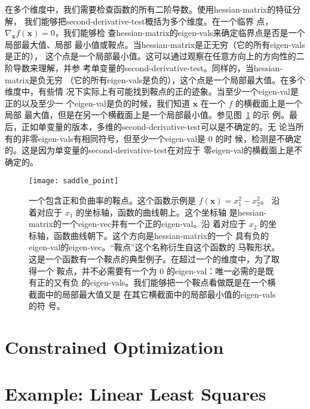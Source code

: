 在多个维度中，我们需要检查函数的所有二阶导数。使用\gls*{hessian-matrix}的特征分解，
我们能够把\gls*{second-derivative-test}概括为多个维度。在一个临界
点，$\nabla_{\pmb{x}}f(\pmb{x}) = 0$，我们能够检
查\gls*{hessian-matrix}的\gls*{eigen-vals}来确定临界点是否是一个局部最大值、局部
最小值或鞍点。当\gls*{hessian-matrix}是正无穷（它的所有\gls*{eigen-vals}是正的），
这个点是一个局部最小值。这可以通过观察在任意方向上的方向性的二阶导数来理解，并参
考单变量的\gls*{second-derivative-test}。同样的，当\gls*{hessian-matrix}是负无穷
（它的所有\gls*{eigen-vals}是负的），这个点是一个局部最大值。在多个维度中，有些情
况下实际上有可能找到鞍点的正的迹象。当至少一个\gls*{eigen-val}是正的以及至少一
个\gls*{eigen-val}是负的时候，我们知道 $\pmb{x}$ 在一个 $f$ 的横截面上是一个局部
最大值，但是在另一个横截面上是一个局部最小值。参见图~\ref{fig:saddle_point} 的示
例。最后，正如单变量的版本，多维的\gls*{second-derivative-test}可以是不确定的。无
论当所有的非零\gls*{eigen-vals}有相同符号，但至少一个\gls*{eigen-val}是 $0$ 的时
候，检测是不确定的。这是因为单变量的\gls*{second-derivative-test}在对应于
零\gls*{eigen-val}的横截面上是不确定的。

\begin{figure}[h]
  \centering
  \texttt{[image: saddle\_point]}
  \caption{一个包含正和负曲率的鞍点。这个函数示例是 $f(\pmb{x}) = x^2_1 - x^2_2$。
    沿着对应于 $x_1$ 的坐标轴，函数的曲线朝上。这个坐标轴
    是\gls*{hessian-matrix}的一个\gls*{eigen-vec}并有一个正的\gls*{eigen-val}。沿
    着对应于 $x_2$ 的坐标轴，函数曲线朝下。这个方向是\gls*{hessian-matrix}的一个
    具有负的\gls*{eigen-val}的\gls*{eigen-vec}。``鞍点''这个名称衍生自这个函数的
    马鞍形状。这是一个函数有一个鞍点的典型例子。在超过一个的维度中，为了取得一个
    鞍点，并不必需要有一个为 $0$ 的\gls*{eigen-val}：唯一必需的是既有正的又有负
    的\gls*{eigen-vals}。我们能够把一个鞍点看做既是在一个横截面中的局部最大值又是
    在其它横截面中的局部最小值的\gls*{eigen-vals}的符
    号。\label{fig:saddle_point}}
\end{figure}

\section{Constrained Optimization}
\label{sec:constrained_optimization}

\section{Example: Linear Least Squares}
\label{sec:example:linear_least_squares}
